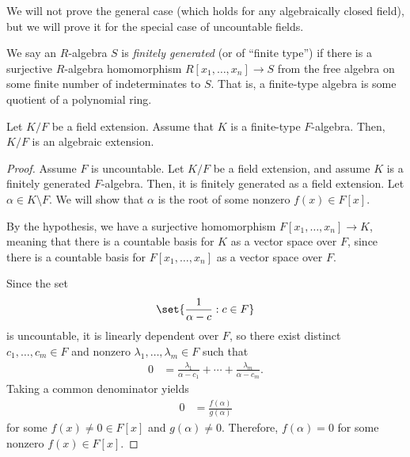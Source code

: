 \documentclass[10pt]{mypackage}
\begin{document}
We will not prove the general case (which holds for any algebraically closed field), but we will prove it for the special case of uncountable fields.
\begin{definition}
  We say an $R$-algebra $S$ is \textit{finitely generated} (or of ``finite type'') if there is a surjective $R$-algebra homomorphism $R\left[ x_1,\dots,x_n \right]\rightarrow S$ from the free algebra on some finite number of indeterminates to $S$. That is, a finite-type algebra is some quotient of a polynomial ring.
\end{definition}
\begin{theorem}
  Let $K/F$ be a field extension. Assume that $K$ is a finite-type $F$-algebra. Then, $K/F$ is an algebraic extension.
\end{theorem}
\begin{proof}
  Assume $F$ is uncountable. Let $K/F$ be a field extension, and assume $K$ is a finitely generated $F$-algebra. Then, it is finitely generated as a field extension. Let $\alpha\in K\setminus F$. We will show that $\alpha$ is the root of some nonzero $f(x)\in F[x]$.

  By the hypothesis, we have a surjective homomorphism $F\left[ x_1,\dots,x_n \right]\rightarrow K$, meaning that there is a countable basis for $K$ as a vector space over $F$, since there is a countable basis for $F\left[ x_1,\dots,x_n \right]$ as a vector space over $F$.

  Since the set
  \begin{align*}
    \set{\frac{1}{\alpha - c} : c\in F}
  \end{align*}
  is uncountable, it is linearly dependent over $F$, so there exist distinct $c_1,\dots,c_m\in F$ and nonzero $\lambda_1,\dots,\lambda_m\in F$ such that
  \begin{align*}
    0 &= \frac{\lambda_1}{\alpha - c_1} + \cdots + \frac{\lambda_m}{\alpha - c_m}.
  \end{align*}
  Taking a common denominator yields
  \begin{align*}
    0 &= \frac{f(\alpha)}{g(\alpha)}
  \end{align*}
  for some $f(x)\neq 0\in F[x]$ and  $g(\alpha)\neq 0$. Therefore, $f(\alpha) = 0$ for some nonzero $f(x)\in F[x]$.
\end{proof}
\end{document}
